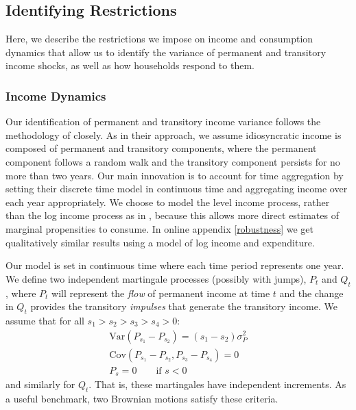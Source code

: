 \documentclass[titlepage]{\econtex}\newcommand{\texname}{ConsumptionHeterogeneity}
\begin{document}
	\subsection{Identifying Restrictions} \label{cov_restrictions}
	Here, we describe the restrictions we impose on income and consumption dynamics that allow us to identify the variance of permanent and transitory income shocks, as well as how households respond to them. 
	
	\subsubsection{Income Dynamics}
	Our identification of permanent and transitory income variance follows the methodology of \cite{carroll_nature_1997} closely. As in their approach, we assume idiosyncratic income is composed of permanent and transitory components, where the permanent component follows a random walk and the transitory component persists for no more than two years. Our main innovation is to account for time aggregation by setting their discrete time model in continuous time and aggregating income over each year appropriately. We choose to model the level income process, rather than the log income process as in \cite{carroll_nature_1997}, because this allows more direct estimates of marginal propensities to consume. In online appendix \ref{robustness} we get qualitatively similar results using a model of log income and expenditure.
	
	Our model is set in continuous time where each time period represents one year. We define two independent martingale processes (possibly with jumps), $P_t$ and $Q_t$, where $P_t$ will represent the \textit{flow} of permanent income at time $t$ and the change in $Q_t$ provides the transitory \textit{impulses} that generate the transitory income. We assume that for all  $s_1>s_2>s_3>s_4>0$:
	\begin{align*}
	\mathrm{Var}(P_{s_1}-P_{s_2})=(s_1-s_2)\sigma_P^2 \\
	\mathrm{Cov}(P_{s_1}-P_{s_2},P_{s_3}-P_{s_4}) = 0 \\
	P_s = 0 \qquad \text{if } s<0
	\end{align*}
	and similarly for $Q_t$. That is, these martingales have independent increments. As a useful benchmark, two Brownian motions satisfy these criteria.
	
\end{document}
